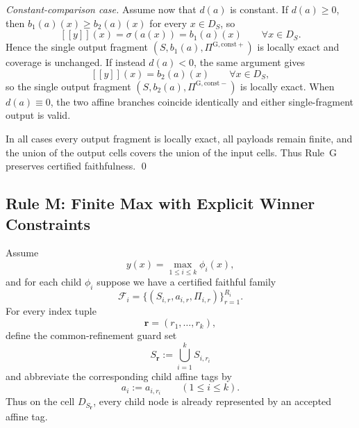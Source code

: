 \emph{Constant-comparison case.}
Assume now that $d(a)$ is constant. If $d(a)\ge 0$, then $b_1(a)(x)\ge b_2(a)(x)$ for every $x\in D_S$, so
\[
 [[y]](x)=\sigma(a(x))=b_1(a)(x)
 \qquad \forall x\in D_S.
\]
Hence the single output fragment $(S,b_1(a),\Pi^{\mathrm G,\mathrm{const}+})$ is locally exact and coverage is unchanged. If instead $d(a)<0$, the same argument gives
\[
 [[y]](x)=b_2(a)(x)
 \qquad \forall x\in D_S,
\]
so the single output fragment $(S,b_2(a),\Pi^{\mathrm G,\mathrm{const}-})$ is locally exact. When $d(a)\equiv 0$, the two affine branches coincide identically and either single-fragment output is valid.

In all cases every output fragment is locally exact, all payloads remain finite, and the union of the output cells covers the union of the input cells. Thus Rule~G preserves certified faithfulness. \qed

\subsection{Rule M: Finite Max with Explicit Winner Constraints}

Assume
\[
 y(x)=\max_{1\le i\le k} \phi_i(x),
\]
and for each child $\phi_i$ suppose we have a certified faithful family
\[
 \mathcal F_i=\{(S_{i,r},a_{i,r},\Pi_{i,r})\}_{r=1}^{R_i}.
\]
For every index tuple
\[
 \mathbf r=(r_1,\dots,r_k),
\]
define the common-refinement guard set
\[
 S_{\mathbf r}:=\bigcup_{i=1}^k S_{i,r_i}
\]
and abbreviate the corresponding child affine tags by
\[
 a_i:=a_{i,r_i}
 \qquad (1\le i\le k).
\]
Thus on the cell $D_{S_{\mathbf r}}$, every child node is already represented by an accepted affine tag.


